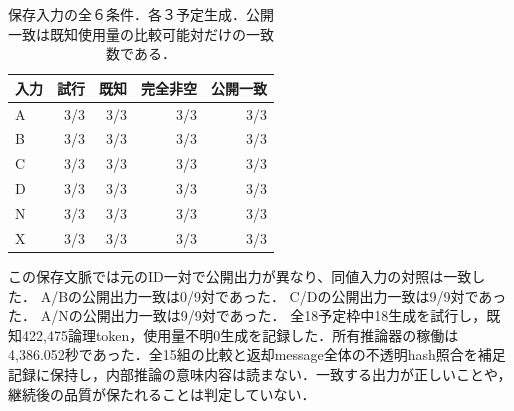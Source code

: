 \begin{table}[tb]
\centering\footnotesize\setlength{\tabcolsep}{3pt}
\caption{保存入力の全６条件．各３予定生成．公開一致は既知使用量の比較可能対だけの一致数である．}
\begin{tabular}{lrrrr}
入力 & 試行 & 既知 & 完全非空 & 公開一致 \\ \hline
A & 3/3 & 3/3 & 3/3 & 3/3 \\
B & 3/3 & 3/3 & 3/3 & 3/3 \\
C & 3/3 & 3/3 & 3/3 & 3/3 \\
D & 3/3 & 3/3 & 3/3 & 3/3 \\
N & 3/3 & 3/3 & 3/3 & 3/3 \\
X & 3/3 & 3/3 & 3/3 & 3/3 \\
\hline\end{tabular}
\end{table}
この保存文脈では元のID一対で公開出力が異なり、同値入力の対照は一致した．
A/Bの公開出力一致は0/9対であった．
C/Dの公開出力一致は9/9対であった．
A/Nの公開出力一致は9/9対であった．
全18予定枠中18生成を試行し，既知422,475論理token，使用量不明0生成を記録した．所有推論器の稼働は4,386.052秒であった．全15組の比較と返却message全体の不透明hash照合を補足記録に保持し，内部推論の意味内容は読まない．一致する出力が正しいことや，継続後の品質が保たれることは判定していない．
